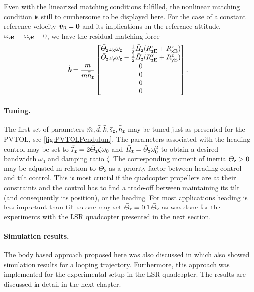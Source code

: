 Even with the linearized matching conditions fulfilled, the nonlinear matching condition is still to cumbersome to be displayed here.
For the case of a constant reference velocity $\dot{\boldsymbol{v}}_{\mathsf{R}} = \boldsymbol{0}$ and its implications on the reference attitude, $\omega_{\mathsf{x}\mathsf{R}}=\omega_{\mathsf{y}\mathsf{R}}=0$, we have the residual matching force
\begin{align} 
 \tilde{\boldsymbol{b}} = \frac{\bar{m}}{m\bar{h}_{\mathsf{z}}}\begin{bmatrix} \bar{\varTheta}_{\mathsf{z}}\omega_{\mathsf{x}}\omega_{\mathsf{z}} - \tfrac{1}{2}\bar{\varPi}_{\mathsf{z}}(R^{\mathsf{x}}_{\mathsf{z}\mathrm{E}}+R^{\mathsf{z}}_{\mathsf{x}\mathrm{E}}) \\ \bar{\varTheta}_{\mathsf{z}}\omega_{\mathsf{y}}\omega_{\mathsf{z}} - \tfrac{1}{2}\bar{\varPi}_{\mathsf{z}}(R^{\mathsf{y}}_{\mathsf{z}\mathrm{E}}+R^{\mathsf{z}}_{\mathsf{y}\mathrm{E}}) \\ 0 \\ 0 \\ 0 \\ 0 \end{bmatrix}
 .
\end{align}

\paragraph{Tuning.}
The first set of parameters $\bar{m}, \bar{d}, \bar{k}, \bar{s}_{\mathsf{z}}, \bar{h}_{\mathsf{z}}$ may be tuned just as presented for the PVTOL, see \autoref{fig:PVTOLPendulum}.
The parameters associated with the heading control may be set to $\bar{\varUpsilon}_{\mathsf{z}}=2\bar{\varTheta}_{\mathsf{z}}\zeta\omega_0$ and $\bar{\varPi}_{\mathsf{z}}=\bar{\varTheta}_{\mathsf{z}}\omega_0^2$ to obtain a desired bandwidth $\omega_0$ and damping ratio $\zeta$.
The corresponding moment of inertia $\bar{\varTheta}_{\mathsf{z}} > 0$ may be adjusted in relation to $\bar{\varTheta}_{\mathsf{x}}$ as a priority factor between heading control and tilt control.
This is most crucial if the quadcopter propellers are at their constraints and the control has to find a trade-off between maintaining its tilt (and consequently its position), or the heading.
For most applications heading is less important than tilt so one may set $\bar{\varTheta}_{\mathsf{z}} = 0.1\,\bar{\varTheta}_{\mathsf{x}}$ as was done for the experiments with the LSR quadcopter presented in the next section.


\paragraph{Simulation results.}
The body based approach proposed here was also discussed in \cite{Konz:GaussTrackingControl} which also showed simulation results for a looping trajectory.
Furthermore, this approach was implemented for the experimental setup in the LSR quadcopter.
The results are discussed in detail in the next chapter.
